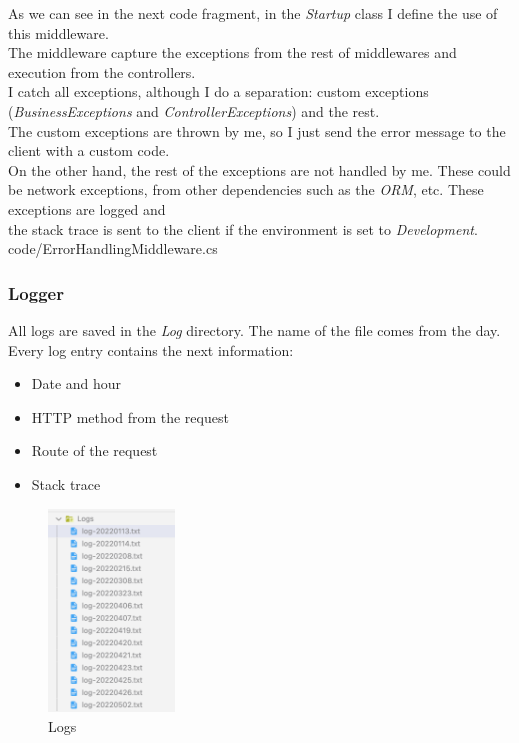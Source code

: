     As we can see in the next code fragment, in the \textit{Startup} class I define the use of this middleware. \\
    The middleware capture the exceptions from the rest of middlewares and execution from the controllers. \\

    I catch all exceptions, although I do a separation: custom exceptions (\textit{BusinessExceptions} and \textit{ControllerExceptions}) and the rest. \\
    The custom exceptions are thrown by me, so I just send the error message to the client with a custom code. \\
    On the other hand, the rest of the exceptions are not handled by me. These could be network exceptions, from other dependencies such as the \textit{ORM}, etc. These exceptions are logged and \\
    the stack trace is sent to the client if the environment is set to \textit{Development}. \\
    
    {code/ErrorHandlingMiddleware.cs}

        \subsubsection{Logger}
        All logs are saved in the \textit{Log} directory. The name of the file comes from the day. Every log entry contains the next information:
        \begin{itemize}
            \item Date and hour
            \item HTTP method from the request
            \item Route of the request
            \item Stack trace
        \end{itemize}
        \begin{figure}[H]
            \centering
                \includegraphics[width=0.3\textwidth]{assets/logs.png}
            \caption{Logs}
            \label{fig:implementation_logs}
        \end{figure}
        
